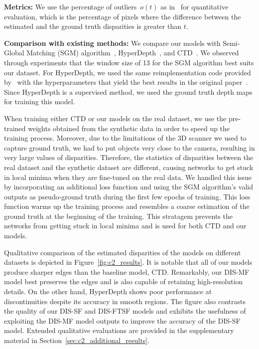 \bigbreak\noindent\textbf{Metrics:} We use the percentage of outliers~$o(t)$ as in~\cite{riegler2019connecting} for quantitative evaluation, which is the percentage of pixels where the difference between the estimated and the ground truth disparities is greater than $t$.

\bigbreak\noindent\textbf{Comparison with existing methods:} We compare our models with Semi-Global Matching (SGM) algorithm~\citep{hirschmuller2007stereo}, HyperDepth~\citep{ryan2016hyperdepth}, and CTD~\citep{riegler2019connecting}. We observed through experiments that the window size of 13 for the SGM algorithm best suits our dataset. For HyperDepth, we used the same reimplementation code provided by~\cite{riegler2019connecting} with the hyperparameters that yield the best results in the original paper~\citep{ryan2016hyperdepth}. Since HyperDepth is a supervised method, we used the ground truth depth maps for training this model.

When training either CTD or our models on the real dataset, we use the pre-trained weights obtained from the synthetic data in order to speed up the training process. Moreover, due to the limitations of the 3D scanner we used to capture ground truth, we had to put objects very close to the camera, resulting in very large values of disparities. Therefore, the statistics of disparities between the real dataset and the synthetic dataset are different, causing networks to get stuck in local minima when they are fine-tuned on the real data. We handled this issue by incorporating an additional loss function and using the SGM algorithm's valid outputs as pseudo-ground truth during the first few epochs of training. This loss function warms up the training process and resembles a coarse estimation of the ground truth at the beginning of the training. This stratagem prevents the networks from getting stuck in local minima and is used for both CTD and our models.

Qualitative comparison of the estimated disparities of the models on different datasets is depicted in Figure~\ref{fig:c2_results}. It is notable that all of our models produce sharper edges than the baseline model, CTD. Remarkably, our DIS-MF model best preserves the edges and is also capable of retaining high-resolution details. On the other hand, HyperDepth shows poor performance at discontinuities despite its accuracy in smooth regions. The figure also contrasts the quality of our DIS-SF and DIS-FTSF models and exhibits the usefulness of exploiting the DIS-MF model outputs to improve the accuracy of the DIS-SF model. Extended qualitative evaluations are provided in the supplementary material in Section~\ref{sec:c2_additional_results}.


